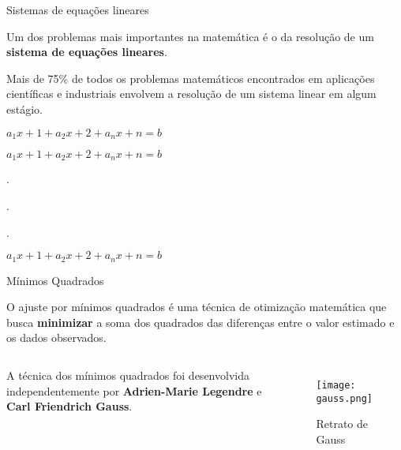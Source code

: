 \begin{frame}[t]{Sistemas de equações lineares} 

   Um dos problemas mais importantes na matemática é o da resolução de um \textbf{sistema de equações lineares}. 
   
   Mais de 75\% de todos os problemas matemáticos encontrados em aplicações científicas e industriais envolvem a resolução de um sistema linear em algum estágio.

   \vspace*{0.45cm}

   \centering

   $a_{1}x+{1} + a_{2}x+{2} + a_{n}x+{n} = b$

   $a_{1}x+{1} + a_{2}x+{2} + a_{n}x+{n} = b$

   .

   .

   .

   $a_{1}x+{1} + a_{2}x+{2} + a_{n}x+{n} = b$

\end{frame}
\begin{frame}[t]{Mínimos Quadrados} 

    O ajuste por mínimos quadrados é uma técnica de otimização matemática que busca \textbf{minimizar} a soma dos quadrados das diferenças entre o valor estimado e os dados observados.
 
    \vspace*{0.45cm}
 
\begin{columns}[c]
    \centering
    A técnica dos mínimos quadrados foi desenvolvida independentemente por \textbf{Adrien-Marie Legendre} e \textbf{Carl Friendrich Gauss}.
   \centering
   \begin{figure}
    \texttt{[image: gauss.png]}
    \caption{Retrato de Gauss}
    \end{figure}
\end{columns}

 \end{frame}
